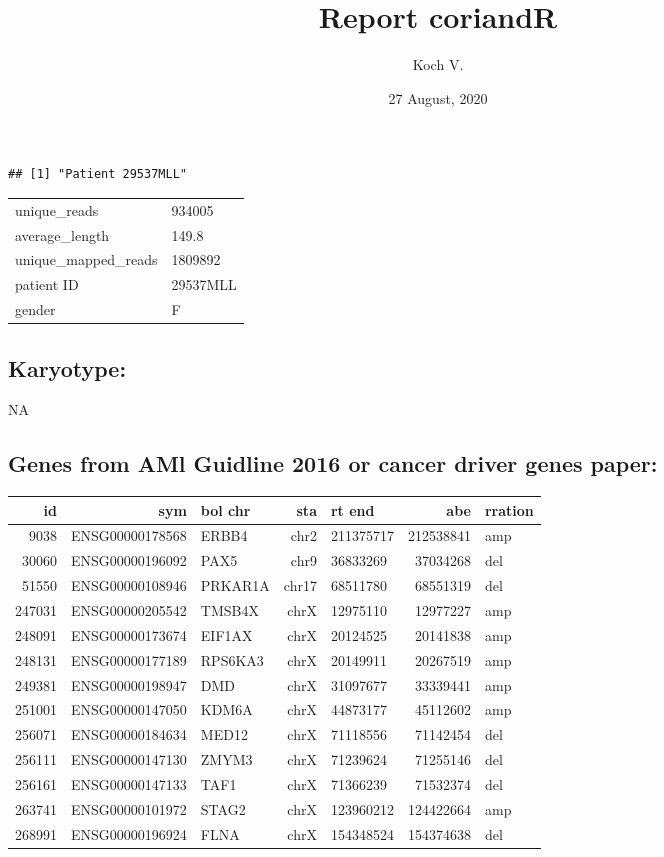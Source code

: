\documentclass[]{article}
\title{Report coriandR}
\author{Koch V.}
\date{27 August, 2020}
\begin{document}
\maketitle

\begin{verbatim}
## [1] "Patient 29537MLL"
\end{verbatim}

\begin{longtable}[]{@{}ll@{}}
\toprule
\endhead
unique\_reads & 934005\tabularnewline
average\_length & 149.8\tabularnewline
unique\_mapped\_reads & 1809892\tabularnewline
patient ID & 29537MLL\tabularnewline
gender & F\tabularnewline
\bottomrule
\end{longtable}

\hypertarget{karyotype}{%
\subsection{Karyotype:}\label{karyotype}}

NA

\hypertarget{genes-from-aml-guidline-2016-or-cancer-driver-genes-paper}{%
\subsection{Genes from AMl Guidline 2016 or cancer driver genes
paper:}\label{genes-from-aml-guidline-2016-or-cancer-driver-genes-paper}}

\begin{longtable}[]{@{}rrlrlrl@{}}
\toprule
id & sym & bol chr & sta & rt end & abe & rration\tabularnewline
\midrule
\endhead
9038 & ENSG00000178568 & ERBB4 & chr2 & 211375717 & 212538841 &
amp\tabularnewline
30060 & ENSG00000196092 & PAX5 & chr9 & 36833269 & 37034268 &
del\tabularnewline
51550 & ENSG00000108946 & PRKAR1A & chr17 & 68511780 & 68551319 &
del\tabularnewline
247031 & ENSG00000205542 & TMSB4X & chrX & 12975110 & 12977227 &
amp\tabularnewline
248091 & ENSG00000173674 & EIF1AX & chrX & 20124525 & 20141838 &
amp\tabularnewline
248131 & ENSG00000177189 & RPS6KA3 & chrX & 20149911 & 20267519 &
amp\tabularnewline
249381 & ENSG00000198947 & DMD & chrX & 31097677 & 33339441 &
amp\tabularnewline
251001 & ENSG00000147050 & KDM6A & chrX & 44873177 & 45112602 &
amp\tabularnewline
256071 & ENSG00000184634 & MED12 & chrX & 71118556 & 71142454 &
del\tabularnewline
256111 & ENSG00000147130 & ZMYM3 & chrX & 71239624 & 71255146 &
del\tabularnewline
256161 & ENSG00000147133 & TAF1 & chrX & 71366239 & 71532374 &
del\tabularnewline
263741 & ENSG00000101972 & STAG2 & chrX & 123960212 & 124422664 &
amp\tabularnewline
268991 & ENSG00000196924 & FLNA & chrX & 154348524 & 154374638 &
del\tabularnewline
\bottomrule
\end{longtable}
\end{document}

